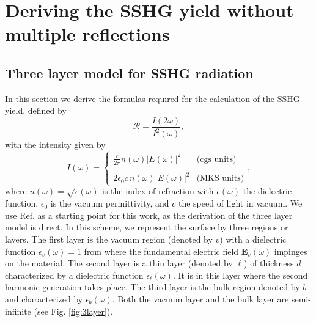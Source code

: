 \chapter{Deriving the SSHG yield without multiple reflections}
\label{app:shgyieldnomr}
\partialtoc


\section{Three layer model for SSHG radiation}\label{sec:threelayer}

In this section we derive the formulas required for the calculation of the SSHG
yield, defined by
\begin{equation}\label{uno}
\mathcal{R}=\frac{I(2\omega)}{I^{2}(\omega)},
\end{equation}
with the intensity given by\cite{boyd}
\begin{equation}\label{dos}
I(\omega)=
\left\{
\begin{array}{cc}
\frac{c}{2\pi}n(\omega) |E(\omega)|^{2}
& \text{(cgs units)} \\\\
2\epsilon_{0}c\, n(\omega)|E(\omega)|^{2}
& \text{(MKS units)}
\end{array}
\right.,
\end{equation}
where $n(\omega)=\sqrt{\epsilon(\omega)}$ is the index of refraction with
$\epsilon(\omega)$ the dielectric function, $\epsilon_{0}$ is the vacuum
permittivity, and $c$ the speed of light in vacuum. We use Ref.
\cite{mizrahiJOSA88} as a starting point for this work, as the derivation
of the three layer model is direct. In this scheme, we represent the surface by
three regions or layers. The first layer is the vacuum region (denoted by $v$)
with a dielectric function $\epsilon_{v}(\omega) = 1$ from where the fundamental
electric field $\mathbf{E}_{v}(\omega)$ impinges on the material. The second
layer is a thin layer (denoted by $\ell$) of thickness $d$ characterized by a
dielectric function $\epsilon_{\ell}(\omega)$. It is in this layer where the
second harmonic generation takes place. The third layer is the bulk region
denoted by $b$ and characterized by $\epsilon_{b}(\omega)$. Both the vacuum
layer and the bulk layer are semi-infinite (see Fig. \ref{fig:3layer}).

